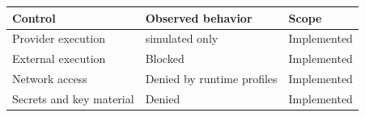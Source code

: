 \begin{tabularx}{\linewidth}{@{}XXX@{}}
\toprule
Control & Observed behavior & Scope \\
\midrule
Provider execution & simulated only & Implemented \\
External execution & Blocked & Implemented \\
Network access & Denied by runtime profiles & Implemented \\
Secrets and key material & Denied & Implemented \\
\bottomrule
\end{tabularx}
